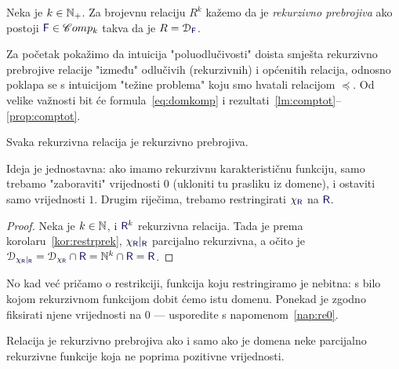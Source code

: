 \begin{definicija}[{name=[rekurzivna prebrojivost]}]\label{def:re}
Neka je $k\in{\mathbb N}_+$. Za brojevnu relaciju $R^k$ kažemo da je \emph{rekurzivno prebrojiva} ako postoji $\f F\in\mathscr Comp_k$ takva da je $R=\dom{\f F}$.
\end{definicija}



Za početak pokažimo da intuicija "poluodlučivosti" doista smješta rekurzivno prebrojive relacije "između" odlučivih (rekurzivnih) i općenitih relacija, odnosno poklapa se s intuicijom "težine problema" koju smo hvatali relacijom $\preceq$. Od velike važnosti bit će formula~\eqref{eq:domkomp} i rezultati~\ref{lm:comptot}--\ref{prop:comptot}.

\begin{propozicija}[{name=[rekurzivna prebrojivost rekurzivnih relacija]}]\label{pp:rekire}
Svaka rekurzivna relacija je rekurzivno prebrojiva.
\end{propozicija}
Ideja je jednostavna: ako imamo rekurzivnu karakterističnu funkciju, samo trebamo "zaboraviti" vrijednosti $0$ (ukloniti tu prasliku iz domene), i ostaviti samo vrijednosti $1$. Drugim riječima, trebamo restringirati $\chi_{\f R}$ na $\f R$.
\begin{proof}
Neka je $k\in{\mathbb N}$, i $\f R^k$ rekurzivna relacija. Tada je prema korolaru~\ref{kor:restrprek}, $\chi_{\f R}|_{\f R}$ parcijalno rekurzivna, a očito je $\dom{\chi_{\f R}|_{\f R}}=\dom{\chi_{\f R}}\cap\f R=\N^k\cap\f R=\f R$.
\end{proof}

No kad već pričamo o restrikciji, funkcija koju restringiramo je nebitna: s bilo kojom rekurzivnom funkcijom dobit ćemo istu domenu. Ponekad je zgodno fiksirati njene vrijednosti na $0$ --- usporedite s napomenom~\ref{nap:re0}.

\begin{korolar}[{name=[za rekurzivno prebrojive domene vrijednosti funkcije nisu bitne]}]\label{kor:redom0im}
Relacija je rekurzivno prebrojiva ako i samo ako je domena neke parcijalno rekurzivne funkcije koja ne poprima pozitivne vrijednosti.
\end{korolar}

